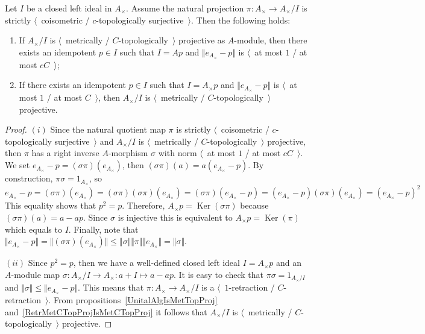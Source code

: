 \begin{proposition}\label{MetTopProjCycModCharac} Let $I$ be a closed left ideal in
$A_\times $. Assume the natural projection $\pi:A_\times\to A_\times/I$ is
strictly $\langle$~coisometric / $c$-topologically surjective~$\rangle$. 
Then the following holds:

\begin{enumerate}[label = (\roman*)]
    \item If $A_\times /I$ is $\langle$~metrically / $C$-topologically~$\rangle$
    projective as $A$-module, then there exists an idempotent $p\in I$ such that
    $I=Ap$ and $\Vert e_{A_\times}-p\Vert$ is $\langle$~at most $1$ / at most
    $cC$~$\rangle$;

    \item If there exists an idempotent $p\in I$ such that $I=A_\times  p$ and
    $\Vert e_{A_\times }-p\Vert$ is $\langle$~at most $1$ / at most
    $C$~$\rangle$, then $A_\times/I$ is $\langle$~metrically /
    $C$-topologically~$\rangle$ projective.
\end{enumerate}
\end{proposition}
\begin{proof} $(i)$ Since the natural quotient map $\pi$ is strictly 
$\langle$~coisometric / $c$-topologically surjective~$\rangle$ and $A_\times /I$
is $\langle$~metrically / $C$-topologically~$\rangle$ projective, then $\pi$ has
a right inverse $A$-morphism $\sigma$ with norm $\langle$~at most $1$ / at most
$cC$~$\rangle$. We set $e_{A_\times }-p=(\sigma\pi)(e_{A_\times })$, then
$(\sigma\pi)(a)=a(e_{A_\times }-p)$. By construction, $\pi\sigma=1_{A_\times }$,
so  
$$
e_{A_\times }-p
=(\sigma\pi)(e_{A_\times })
=(\sigma\pi)(\sigma\pi)(e_{A_\times })
=(\sigma\pi)(e_{A_\times }-p)
=(e_{A_\times }-p)(\sigma\pi)(e_{A_\times })
={(e_{A_\times }-p)}^2
$$
This equality shows that $p^2=p$. Therefore, $A_\times
p=\operatorname{Ker}(\sigma\pi)$ because $(\sigma\pi)(a)=a-ap$. Since $\sigma$
is injective this is equivalent to $A_\times p=\operatorname{Ker}(\pi)$ which
equals to $I$. Finally, note that 
$\Vert e_{A_\times }-p\Vert
=\Vert(\sigma\pi)(e_{A_\times})\Vert
\leq\Vert\sigma\Vert\Vert\pi\Vert\Vert e_{A_\times }\Vert
=\Vert\sigma\Vert$.

$(ii)$ Since $p^2=p$, then we have a well-defined closed left ideal $I=A_\times p$ and
an $A$-module map $\sigma:A_\times /I\to A_\times:a+I\mapsto a-ap$. It is easy
to check that $\pi\sigma=1_{A_\times/I}$ 
and $\Vert\sigma\Vert\leq\Vert e_{A_\times }-p\Vert$. 
This means that $\pi:A_\times \to A_\times /I$ is a
$\langle$~$1$-retraction / $C$-retraction~$\rangle$. From
propositions~\ref{UnitalAlgIsMetTopProj} 
and~\ref{RetrMetCTopProjIsMetCTopProj} it follows that $A_\times /I$ is
$\langle$~metrically / $C$-topologically~$\rangle$ projective.
\end{proof} 


